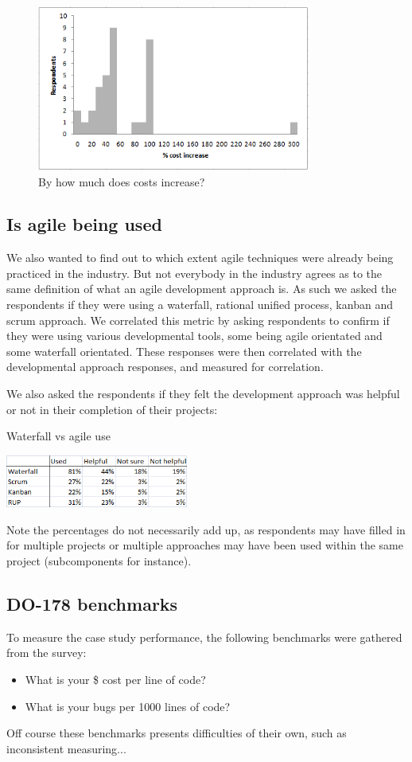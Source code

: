 \documentclass[conference]{IEEEtran}
\begin{document}
\begin{figure}[t!]
\centering 
\includegraphics[width=90mm]{Cost_histogram.png}
\caption{By how much does costs increase?}
\end{figure}

\subsection{Is agile being used}
We also wanted to find out to which extent agile techniques were already being practiced in the industry. But not everybody in the industry agrees as to the same definition of what an agile development approach is. As such we asked the respondents if they were using a waterfall, rational unified process, kanban and scrum approach. We correlated this metric by asking respondents to confirm if they were using various developmental tools, some being agile orientated and some waterfall orientated. These responses were then correlated with the developmental approach responses, and measured for correlation. 

We also asked the respondents if they felt the development approach was helpful or not in their completion of their projects:

\begin{table}[t!]
\centering
\caption{Waterfall vs agile use}
\includegraphics[width=60mm]{Agile_waterfall_uptake.png}
\end{table}

Note the percentages do not necessarily add up, as respondents may have filled in for multiple projects or multiple approaches may have been used within the same project (subcomponents for instance).    
 
\subsection{DO-178 benchmarks}
To measure the case study performance, the following benchmarks were gathered from the survey:
\begin{itemize}
	\item What is your \$ cost per line of code?
	\item What is your bugs per 1000 lines of code?
\end{itemize}
Off course these benchmarks presents difficulties of their own, such as inconsistent measuring...
\end{document}
